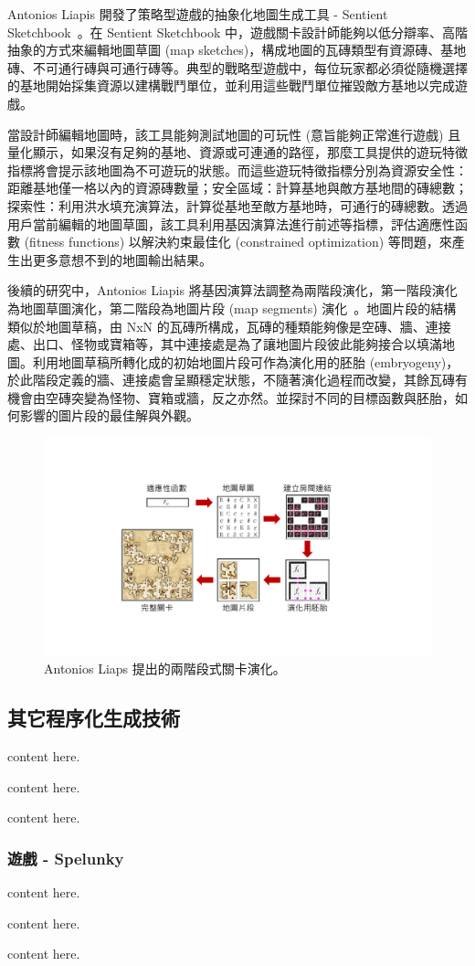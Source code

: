 Antonios Liapis 開發了策略型遊戲的抽象化地圖生成工具 - Sentient Sketchbook~\cite{liapis2013generating}。在 Sentient Sketchbook 中，遊戲關卡設計師能夠以低分辯率、高階抽象的方式來編輯地圖草圖 (map sketches)，構成地圖的瓦磚類型有資源磚、基地磚、不可通行磚與可通行磚等。典型的戰略型遊戲中，每位玩家都必須從隨機選擇的基地開始採集資源以建構戰鬥單位，並利用這些戰鬥單位摧毀敵方基地以完成遊戲。

當設計師編輯地圖時，該工具能夠測試地圖的可玩性 (意旨能夠正常進行遊戲) 且量化顯示，如果沒有足夠的基地、資源或可連通的路徑，那麼工具提供的遊玩特徵指標將會提示該地圖為不可遊玩的狀態。而這些遊玩特徵指標分別為資源安全性：距離基地僅一格以內的資源磚數量；安全區域：計算基地與敵方基地間的磚總數；探索性：利用洪水填充演算法，計算從基地至敵方基地時，可通行的磚總數。透過用戶當前編輯的地圖草圖，該工具利用基因演算法進行前述等指標，評估適應性函數 (fitness functions) 以解決約束最佳化 (constrained optimization) 等問題，來產生出更多意想不到的地圖輸出結果。

後續的研究中，Antonios Liapis 將基因演算法調整為兩階段演化，第一階段演化為地圖草圖演化，第二階段為地圖片段 (map segments) 演化~\cite{liapis2017multi}。地圖片段的結構類似於地圖草稿，由 NxN 的瓦磚所構成，瓦磚的種類能夠像是空磚、牆、連接處、出口、怪物或寶箱等，其中連接處是為了讓地圖片段彼此能夠接合以填滿地圖。利用地圖草稿所轉化成的初始地圖片段可作為演化用的胚胎 (embryogeny)，於此階段定義的牆、連接處會呈顯穩定狀態，不隨著演化過程而改變，其餘瓦磚有機會由空磚突變為怪物、寶箱或牆，反之亦然。並探討不同的目標函數與胚胎，如何影響的圖片段的最佳解與外觀。

\begin{figure}[h]
  \begin{center}
    \includegraphics[width=1.0\textwidth]{figures/Multi-segment演化框架.pdf}
    \caption{Antonios Liaps 提出的兩階段式關卡演化。} 
    \label{fig:multi-segment-evolution}
  \end{center}
\end{figure}

\subsection{其它程序化生成技術}
\label{ssec:relatedworks-others}

content here.

content here.

content here.

\subsubsection{遊戲 - Spelunky}
\label{sssec:relatedworks-others-spelunky}

content here.

content here.

content here.
